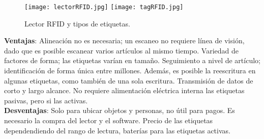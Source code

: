 \begin{figure} 	
	\texttt{[image: lectorRFID.jpg]}
	\texttt{[image: tagRFID.jpg]}
	\caption{Lector RFID y tipos de etiquetas.}
	\label{fig:rfid2}
\end{figure}

\textbf{Ventajas}: Alineación no es necesaria; un escaneo no requiere línea de visión, dado que es posible escanear varios artículos al mismo tiempo. Variedad de factores de forma; las etiquetas varían en tamaño. Seguimiento a nivel de artículo; identificación de forma única entre millones. Además, es posible la reescritura en algunas etiquetas, como también de una sola escritura. Transmisión de datos de corto y largo alcance. No requiere alimentación eléctrica interna las etiquetas pasivas, pero si las activas.\cite{2006_BillGlover_BOOK,2011_Coskun_BOOK}
\\
\textbf{Desventajas}: Solo para ubicar objetos y personas, no útil para pagos. Es necesario la compra del lector y el software.\cite{2005_Landt} Precio de las etiquetas dependendiendo del rango de lectura, baterías para las etiquetas activas.

